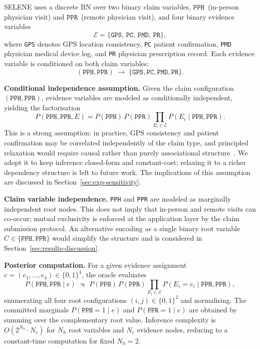 \documentclass[journal]{IEEEtran}
\theoremstyle{definition}
\theoremstyle{remark}
\begin{document}
SELENE uses a discrete BN over two binary claim
variables, $\texttt{PPH}$~(in-person physician visit)
and $\texttt{PPR}$~(remote physician visit), and four
binary evidence variables
\[
  \mathcal{E}=\{
    \texttt{GPS},\,\texttt{PC},\,
    \texttt{PMD},\,\texttt{PR}
  \},
\]
where \texttt{GPS} denotes GPS location consistency,
\texttt{PC} patient confirmation, \texttt{PMD}
physician medical device log, and \texttt{PR}
physician prescription record.
Each evidence variable is conditioned on both claim
variables:
\[
  (\texttt{PPH},\texttt{PPR})
  \;\rightarrow\;
  \{\texttt{GPS},\texttt{PC},\texttt{PMD},\texttt{PR}\}.
\]

\noindent\textbf{Conditional independence assumption.}
Given the claim configuration $(\texttt{PPH},
\texttt{PPR})$, evidence variables are modeled as
conditionally independent, yielding the factorisation
\begin{equation}
  P(\texttt{PPH},\texttt{PPR},E)
  =
  P(\texttt{PPH})\,P(\texttt{PPR})
  \prod_{E_i\in\mathcal{E}}
  P(E_i\mid \texttt{PPH},\texttt{PPR}).
  \label{eq:factorization}
\end{equation}
This is a strong assumption: in practice, GPS
consistency and patient confirmation may be correlated
independently of the claim type, and principled relaxation
would require causal rather than purely associational
structure~\cite{cox2024objective}. We adopt it to keep
inference closed-form and constant-cost; relaxing it
to a richer dependency structure is left to future
work. The implications of this assumption are discussed
in Section~\ref{sec:exp-sensitivity}.

\noindent\textbf{Claim variable independence.}
\texttt{PPH} and \texttt{PPR} are modeled as
marginally independent root nodes. This does not imply
that in-person and remote visits can co-occur; mutual
exclusivity is enforced at the application layer by
the claim submission protocol. An alternative encoding
as a single binary root variable
$C\in\{\texttt{PPH},\texttt{PPR}\}$ would simplify the
structure and is considered in
Section~\ref{sec:results-discussion}.

\noindent\textbf{Posterior computation.}
For a given evidence assignment
$e=(e_1,\dots,e_4)\in\{0,1\}^4$, the oracle evaluates
\begin{equation}
  P(\texttt{PPH},\texttt{PPR}\mid e)
  \;\propto\;
  P(\texttt{PPH})\,P(\texttt{PPR})
  \prod_{E_i\in\mathcal{E}}
  P(E_i=e_i\mid \texttt{PPH},\texttt{PPR}),
  \label{eq:posterior}
\end{equation}
enumerating all four root configurations
$(i,j)\in\{0,1\}^2$ and normalising.
The committed marginals $P(\texttt{PPH}=1\mid e)$ and
$P(\texttt{PPR}=1\mid e)$ are obtained by summing over
the complementary root value. Inference complexity is
$O(2^{N_h}\cdot N_e)$ for $N_h$ root variables and
$N_e$ evidence nodes, reducing to a constant-time
computation for fixed $N_h=2$.
\end{document}

